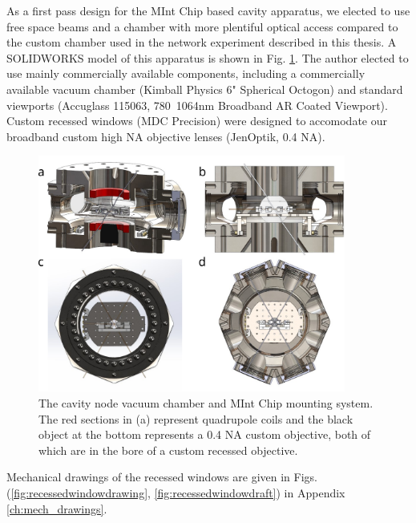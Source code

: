 As a first pass design for the MInt Chip based cavity apparatus, we elected to use free space beams and a chamber with more plentiful optical access compared to the custom chamber used in the network experiment described in this thesis. A SOLIDWORKS model of this apparatus is shown in Fig. \ref{fig:cavnodechamber}. The author elected to use mainly commercially available components, including a commercially available vacuum chamber (Kimball Physics 6" Spherical Octogon) and standard viewports (Accuglass 115063, 780~1064nm Broadband AR Coated Viewport). Custom recessed windows (MDC Precision) were designed to accomodate our broadband custom high NA objective lenses (JenOptik, 0.4 NA).
\begin{figure}[htb]
    \centering
    \includegraphics[width=0.9\textwidth]{Images/mint_chip_science_chamber.pdf}
    \caption{The cavity node vacuum chamber and MInt Chip mounting system. The red sections in (a) represent quadrupole coils and the black object at the bottom represents a 0.4 NA  custom objective, both of which are in the bore of a custom recessed objective.}
    \label{fig:cavnodechamber}
\end{figure}
Mechanical drawings of the recessed windows are given in Figs. (\ref{fig:recessedwindowdrawing}, \ref{fig:recessedwindowdraft}) in Appendix \ref{ch:mech_drawings}.
    


